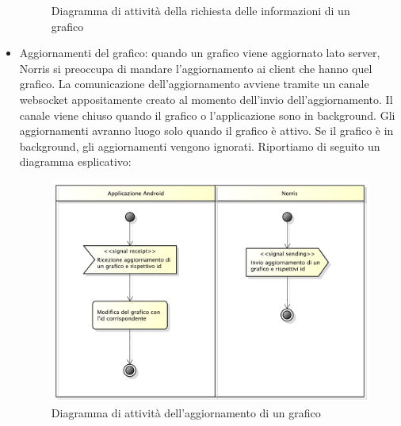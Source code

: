 \begin{itemize}
\begin{figure}[H]
        	\caption{Diagramma di attività della richiesta delle informazioni di un grafico}
    		\end{figure}
            \item Aggiornamenti del grafico: quando un grafico viene aggiornato lato server, Norris si preoccupa di mandare l'aggiornamento ai client che hanno quel grafico. La comunicazione dell'aggiornamento avviene tramite un canale websocket appositamente creato al momento dell'invio dell'aggiornamento. Il canale viene chiuso quando il grafico o l'applicazione sono in background. Gli aggiornamenti avranno luogo solo quando il grafico è attivo. Se il grafico è in background, gli aggiornamenti vengono ignorati. Riportiamo di seguito un diagramma esplicativo:
            \begin{figure}[H]\centering
        	\includegraphics[width=\textwidth]{SpecificaTecnica/Pics/Applicazione/AggiornamentiGrafico.pdf}
        	\caption{Diagramma di attività dell'aggiornamento di un grafico}
    		\end{figure}
        \end{itemize}
